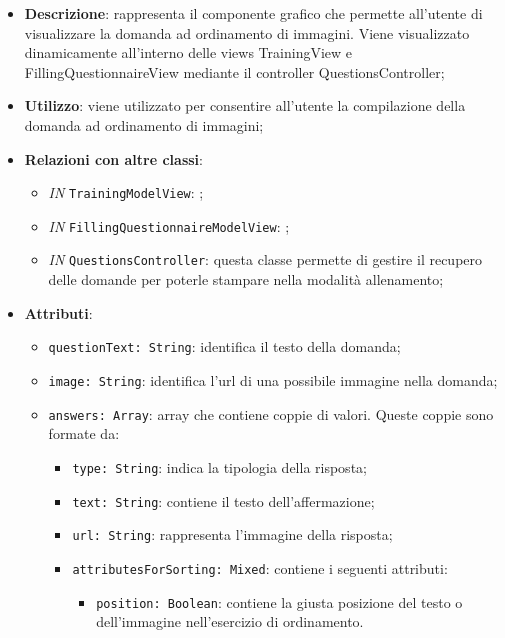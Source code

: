 		\begin{itemize}
			\item \textbf{Descrizione}: rappresenta il componente grafico che permette all'utente di visualizzare la domanda ad ordinamento di immagini. Viene visualizzato dinamicamente all'interno delle views TrainingView e FillingQuestionnaireView mediante il controller QuestionsController;
			\item \textbf{Utilizzo}: viene utilizzato per consentire all'utente la compilazione della domanda ad ordinamento di immagini;
			\item \textbf{Relazioni con altre classi}: 
			\begin{itemize}
				\item \textit{IN} \texttt{TrainingModelView}: ; 
				\item \textit{IN} \texttt{FillingQuestionnaireModelView}: ;
				\item \textit{IN} \texttt{QuestionsController}: questa classe permette di gestire il recupero delle domande per poterle stampare nella modalità allenamento;
			\end{itemize}
			\item \textbf{Attributi}: 
			\begin{itemize}
					\item \texttt{questionText: String}: identifica il testo della domanda;
					\item \texttt{image: String}: identifica l'url di una possibile immagine nella domanda;
					\item \texttt{answers: Array}: array che contiene coppie di valori. Queste coppie sono formate da:
					\begin{itemize}
						\item \texttt{type: String}: indica la tipologia della risposta;
						\item \texttt{text: String}: contiene il testo dell'affermazione;
						\item \texttt{url: String}: rappresenta l'immagine della risposta;
						\item \texttt{attributesForSorting: Mixed}: contiene i seguenti attributi:
						\begin{itemize}
							\item \texttt{position: Boolean}: contiene la giusta posizione del testo o dell'immagine nell'esercizio di ordinamento.
						\end{itemize}
					\end{itemize}
			\end{itemize}
		\end{itemize}
		
